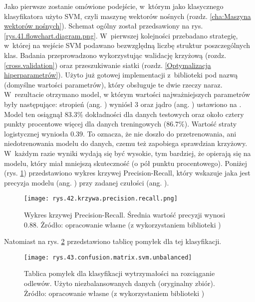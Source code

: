Jako pierwsze zostanie omówione podejście, w~którym jako klasycznego klasyfikatora użyto SVM, czyli maszynę wektorów nośnych (rozdz. \ref{cha:Maszyna wektorów nośnych}). Schemat ogólny został przedsawiony na rys. \ref{rys.41.flowchart.diagram.png}. W~pierwszej kolejności przebadano strategię, w~której na wejście SVM podawano bezwzględną liczbę struktur poszczególnych klas. Badania przeprowadzono wykorzystując walidację krzyżową (rozdz. \ref{cross.validation}) oraz przeszukiwanie siatki (rozdz. \ref{Optymalizacja hiperparametrów}). Użyto już gotowej implementacji z~biblioteki  pod nazwą  (domyślne wartości parametrów), który obsługuje te dwie rzeczy naraz. W~rezultacie otrzymano model, w którym wartości najważniejszych parametrów były następujące: stropień (ang. ) wyniósł 3 oraz jądro (ang. ) ustawiono na . Model ten osiągnął $83.3\%$ dokładności dla danych testowych oraz około cztery punkty procentowe więcej dla danych treningowych ($86.7\%$). Wartość straty logistycznej wyniosła $0.39$. To oznacza, że nie doszło do przetrenowania, ani niedotrenowania modelu do danych, czemu też zapobiega sprawdzian krzyżowy. W~każdym razie wyniki wydają się być wysokie, tym bardziej, że opierają się na modelu, który miał mniejszą skuteczność (o pół punktu procentowego). Poniżej (rys. \ref{rys.42.krzywa.precision.recall.png}) przedstawiono wykres krzywej Precision-Recall, który wskazuje jaka jest precyzja modelu (ang. ) przy zadanej czułości (ang. ). 
\begin{figure}[h]
    \centering
    \texttt{[image: rys.42.krzywa.precision.recall.png]}
    \caption{Wykres krzywej Precision-Recall. Średnia wartość precyzji wynosi 0.88. Żródło: opracowanie własne (z wykorzystaniem biblioteki )}
    \label{rys.42.krzywa.precision.recall.png}
\end{figure}
Natomiast na rys. \ref{rys.43.confusion.matrix.svm.unbalanced} przedstawiono tablicę pomyłek dla tej klasyfikacji.
\begin{figure}[h]
    \centering
    \texttt{[image: rys.43.confusion.matrix.svm.unbalanced]}
    \caption{Tablica pomyłek dla klasyfikacji wytrzymałości na rozciąganie odlewów. Użyto niezbalansowanych danych (oryginalny zbiór). Żródło: opracowanie własne (z wykorzystaniem biblioteki )}
    \label{rys.43.confusion.matrix.svm.unbalanced}
\end{figure}

